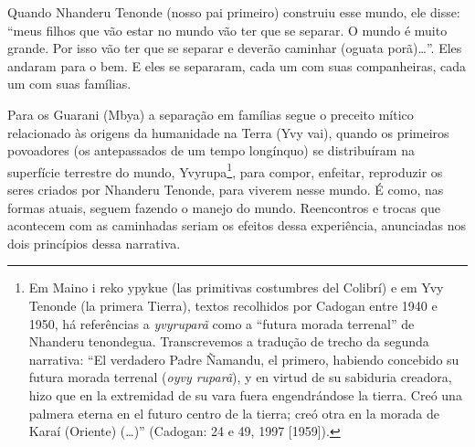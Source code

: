 Quando Nhanderu Tenonde (nosso pai primeiro) construiu esse mundo, ele
disse: ``meus filhos que vão estar no mundo vão ter que se separar. O
mundo é muito grande. Por isso vão ter que se separar e deverão
caminhar (oguata porã)\ldots{}''. Eles andaram para o bem. E eles se
separaram, cada um com suas companheiras, cada um com suas famílias. 

Para os Guarani (Mbya) a separação em famílias segue o preceito mítico
relacionado às origens da humanidade na Terra (Yvy vai), quando os
primeiros povoadores (os antepassados de um tempo longínquo) se
distribuíram na superfície terrestre do mundo, Yvyrupa\footnote{Em
Maino i reko ypykue (las primitivas costumbres del Colibrí) e em Yvy
Tenonde (la primera Tierra), textos recolhidos por Cadogan entre 1940 e
1950, há referências a \emph{yvyruparã} como a ``futura morada terrenal'' de
Nhanderu tenondegua. Transcrevemos a tradução de trecho da segunda
narrativa: ``El verdadero Padre Ñamandu, el primero, habiendo concebido
su futura morada terrenal (\emph{oyvy ruparã}), y en virtud de su sabiduria
creadora, hizo que en la extremidad de su vara fuera engendrándose la
tierra. Creó una palmera eterna en el futuro centro de la tierra; creó
otra en la morada de Karaí (Oriente) (\ldots{})'' (Cadogan: 24 e 49, 1997
[1959]).}, para compor, enfeitar, reproduzir os seres criados por
Nhanderu Tenonde, para viverem nesse mundo.  É como, nas formas atuais,
seguem fazendo o manejo do mundo. Reencontros e trocas que acontecem
com as caminhadas seriam os efeitos dessa experiência, anunciadas nos
dois princípios dessa narrativa.


